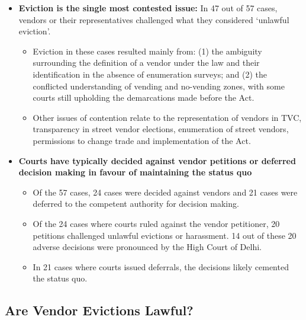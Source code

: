 \documentclass[a4paper, 12pt, twoside, table]{article}
\begin{document}
{\begin{itemize}
\item \textbf{Eviction is the single most contested issue:} In 47 out of 57 cases, vendors or their representatives challenged what they considered `unlawful eviction'.

\begin{itemize}
\item 	Eviction in these cases resulted mainly from: (1) the ambiguity surrounding the definition of a vendor under the law and their identification in the absence of enumeration surveys; and (2) the conflicted understanding of vending and no-vending zones, with some courts still upholding the demarcations made before the Act.

\item 	Other issues of contention relate to the representation of vendors in TVC, transparency in street vendor elections, enumeration of street vendors, permissions to change trade and implementation of the Act. 

\end{itemize}

\end{itemize}

\begin{itemize}
\item \textbf{Courts have typically decided against vendor petitions or deferred decision making in favour of maintaining the status quo} 

\begin{itemize}
\item 	Of the 57 cases, 24 cases were decided against vendors and 21 cases were deferred to the competent authority for decision making. 
\item 	Of the 24 cases where courts ruled against the vendor petitioner, 20 petitions challenged unlawful evictions or harassment. 14 out of these 20 adverse decisions were pronounced by the High Court of Delhi.
\item 	In 21 cases where courts issued deferrals, the decisions likely cemented the status quo.
\end{itemize}
\end{itemize}

\subsection*{Are Vendor Evictions Lawful?}

}
\end{document}
